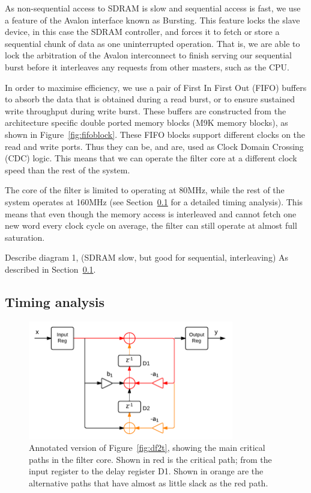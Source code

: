 \documentclass[]{article}
\begin{document}
As non-sequential access to SDRAM is slow and sequential access is fast, we use a feature of the Avalon interface known as Bursting. This feature locks the slave device, in this case the SDRAM controller, and forces it to fetch or store a sequential chunk of data as one uninterrupted operation.
That is, we are able to lock the arbitration of the Avalon interconnect to finish serving our sequential burst before it interleaves any requests from other masters, such as the CPU.

In order to maximise efficiency, we use a pair of First In First Out (FIFO) buffers to absorb the data that is obtained during a read burst, or to ensure sustained write throughput during write burst.
These buffers are constructed from the architecture specific double ported memory blocks (M9K memory blocks), as shown in Figure~\ref{fig:fifoblock}.
These FIFO blocks support different clocks on the read and write ports. Thus they can be, and are, used as Clock Domain Crossing (CDC) logic. This means that we can operate the filter core at a different clock speed than the rest of the system.

The core of the filter is limited to operating at 80MHz, while the rest of the system operates at 160MHz (see Section~\ref{sub:timing_analysis} for a detailed timing analysis). This means that even though the memory access is interleaved and cannot fetch one new word every clock cycle on average, the filter can still operate at almost full saturation.


Describe diagram 1, (SDRAM slow, but good for sequential, interleaving)
As described in Section~\ref{sub:timing_analysis}.




\subsection{Timing analysis} %
\label{sub:timing_analysis}

\begin{figure}[htbp]
	\begin{center}
		\includegraphics[width = 0.8\textwidth]{DirectFormIITransposedCritpath.pdf}
	\end{center}
	\caption{Annotated version of Figure~\ref{fig:df2t}, showing the main critical paths in the filter core. Shown in red is the critical path; from the input register to the delay register D1. Shown in orange are the alternative paths that have almost as little slack as the red path.}
	\label{fig:df2tCritpath}
\end{figure}
\end{document}
